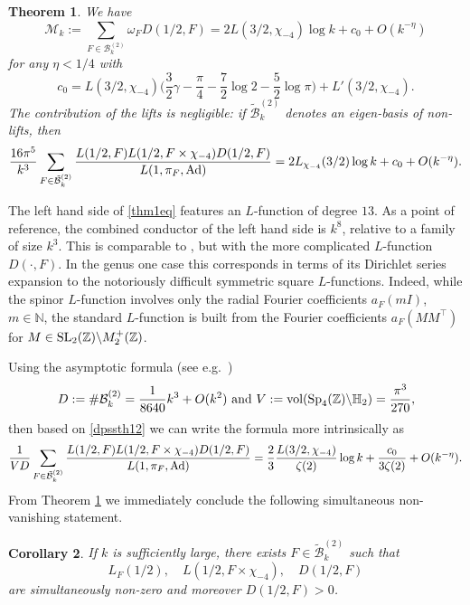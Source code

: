 \documentclass[11pt]{amsart}
\numberwithin{equation}{section}
\theoremstyle{plain}
\newtheorem{theorem}{Theorem}
\newtheorem{cor}[theorem]{Corollary}
\theoremstyle{definition}
\numberwithin{equation}{section}
\begin{document}
 \begin{theorem}\label{thm1} We have
 \[
 \mathcal{M}_k := \sum_{F \in \mathcal{B}_k^{(2)}} \omega_F D(1/2,F) = 2 L(3/2, \chi_{-4}) \log k  + c_0 + O(k^{-\eta})
\]
for any $\eta < 1/4$ with
\[c_0 = L(3/2, \chi_{-4}) \Big(\frac{3}{2} \gamma - \frac{\pi}{4} -\frac{7}{2} \log 2 - \frac{5}{2} \log \pi\Big) + L'(3/2, \chi_{-4}).
\]
The contribution of the lifts is negligible: if $\tilde{\mathcal{B}}_k^{(2)}$ denotes an eigen-basis of non-lifts, then
\begin{equation}\label{thm1eq}
\frac{16\pi^5}{k^3}\sum_{F \in \tilde{\mathcal{B}}_k^{(2)}} \frac{ L(1/2, F)  L(1/2, F \times \chi_{-4} )    D(1/2, F) }{L(1, \pi_F,\text{{\rm Ad}})}  = 2 L_{\chi_{-4}}(3/2) \log k  + c_0 + O(k^{-\eta}).
\end{equation}
\end{theorem}

The left hand side of \eqref{thm1eq} features   an $L$-function of degree $13$.  As a point of reference, the combined conductor of the left hand side is $k^8$, relative to a family of size $k^3$. This is comparable to \cite{Bl}, but with the more complicated $L$-function $D(\cdot, F)$. In the genus one case this  corresponds in terms of its Dirichlet series expansion to the notoriously difficult symmetric square $L$-functions. Indeed, while the spinor $L$-function  involves only the radial Fourier coefficients $a_F(mI)$, $m \in \mathbb{N}$, the standard $L$-function is built from the Fourier coefficients $a_F(MM^{\top})$ for $M \in {\rm SL}_2(\mathbb{Z}) \backslash M_2^+(\mathbb{Z})$.

Using the asymptotic formula (see e.g.\ \cite[Theorem~5]{Ig}) 
\[ D := \#\mathcal{B}_k^{(2)} = \frac{1}{8640}k^3 + O(k^2) \text{ and } V := \text{vol}({\rm Sp}_4( \mathbb{Z})\backslash \mathbb{H}_2) = \frac{\pi^3}{270},
\]
then based on \eqref{dpssth12} we can write the formula more intrinsically as
 \[ \frac{1}{V D}   \sum_{F \in \tilde{\mathcal{B}}_k^{(2)}} \frac{L(1/2, F)L(1/2, F \times \chi_{-4})D(1/2, F)}{L(1, \pi_F,\text{{\rm Ad}})}  = \frac{2}{3} \frac{L(3/2, \chi_{-4})}{\zeta(2)} \log k  + \frac{c_0}{3\zeta(2)} + O(k^{-\eta}).
\]
From Theorem \ref{thm1} we immediately conclude  the following simultaneous non-vanishing statement. 
\begin{cor}\label{Kor} If $k$ is sufficiently large, there exists $F \in \tilde{\mathcal{B}}_k^{(2)}$ such that
$$L_F(1/2), \quad  L(1/2, F \times \chi_{-4}), \quad D(1/2, F)$$
are simultaneously non-zero and moreover $D(1/2, F)>0$.
\end{cor}
\end{document}
